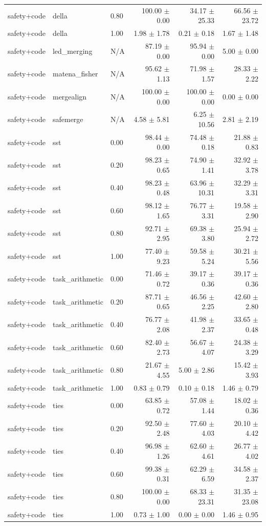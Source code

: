 \documentclass{article}
\begin{document}
\begin{table}[H]
{\begin{tabular}{lllrrr}
safety+code & della & 0.80 & 100.00 $\pm$ 0.00 & 34.17 $\pm$ 25.33 & 66.56 $\pm$ 23.72 \\
safety+code & della & 1.00 & 1.98 $\pm$ 1.78 & 0.21 $\pm$ 0.18 & 1.67 $\pm$ 1.48 \\
safety+code & led\_merging & N/A & 87.19 $\pm$ 0.00 & 95.94 $\pm$ 0.00 & 5.00 $\pm$ 0.00 \\
safety+code & matena\_fisher & N/A & 95.62 $\pm$ 1.13 & 71.98 $\pm$ 1.57 & 28.33 $\pm$ 2.22 \\
safety+code & mergealign & N/A & 100.00 $\pm$ 0.00 & 100.00 $\pm$ 0.00 & 0.00 $\pm$ 0.00 \\
safety+code & safemerge & N/A & 4.58 $\pm$ 5.81 & 6.25 $\pm$ 10.56 & 2.81 $\pm$ 2.19 \\
safety+code & sst & 0.00 & 98.44 $\pm$ 0.00 & 74.48 $\pm$ 0.18 & 21.88 $\pm$ 0.83 \\
safety+code & sst & 0.20 & 98.23 $\pm$ 0.65 & 74.90 $\pm$ 1.41 & 32.92 $\pm$ 3.78 \\
safety+code & sst & 0.40 & 98.23 $\pm$ 0.48 & 63.96 $\pm$ 10.31 & 32.29 $\pm$ 3.31 \\
safety+code & sst & 0.60 & 98.12 $\pm$ 1.65 & 76.77 $\pm$ 3.31 & 19.58 $\pm$ 2.90 \\
safety+code & sst & 0.80 & 92.71 $\pm$ 2.95 & 69.38 $\pm$ 3.80 & 25.94 $\pm$ 2.72 \\
safety+code & sst & 1.00 & 77.40 $\pm$ 9.23 & 59.58 $\pm$ 5.24 & 30.21 $\pm$ 5.56 \\
safety+code & task\_arithmetic & 0.00 & 71.46 $\pm$ 0.72 & 39.17 $\pm$ 0.36 & 39.17 $\pm$ 0.36 \\
safety+code & task\_arithmetic & 0.20 & 87.71 $\pm$ 0.65 & 46.56 $\pm$ 2.25 & 42.60 $\pm$ 2.80 \\
safety+code & task\_arithmetic & 0.40 & 76.77 $\pm$ 2.08 & 41.98 $\pm$ 2.37 & 33.65 $\pm$ 0.48 \\
safety+code & task\_arithmetic & 0.60 & 82.40 $\pm$ 2.73 & 56.67 $\pm$ 4.07 & 24.38 $\pm$ 3.29 \\
safety+code & task\_arithmetic & 0.80 & 21.67 $\pm$ 4.55 & 5.00 $\pm$ 2.86 & 15.42 $\pm$ 3.93 \\
safety+code & task\_arithmetic & 1.00 & 0.83 $\pm$ 0.79 & 0.10 $\pm$ 0.18 & 1.46 $\pm$ 0.79 \\
safety+code & ties & 0.00 & 63.85 $\pm$ 0.72 & 57.08 $\pm$ 1.44 & 18.02 $\pm$ 0.36 \\
safety+code & ties & 0.20 & 92.50 $\pm$ 2.48 & 77.60 $\pm$ 4.03 & 20.10 $\pm$ 4.42 \\
safety+code & ties & 0.40 & 96.98 $\pm$ 1.26 & 62.60 $\pm$ 4.61 & 26.77 $\pm$ 4.02 \\
safety+code & ties & 0.60 & 99.38 $\pm$ 0.31 & 62.29 $\pm$ 6.59 & 34.58 $\pm$ 2.37 \\
safety+code & ties & 0.80 & 100.00 $\pm$ 0.00 & 68.33 $\pm$ 23.31 & 31.35 $\pm$ 23.08 \\
safety+code & ties & 1.00 & 0.73 $\pm$ 1.00 & 0.00 $\pm$ 0.00 & 1.46 $\pm$ 0.95 \\
\bottomrule
\end{tabular}
}
\end{table}
\end{document}
